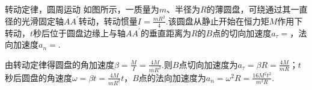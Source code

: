{\hspace{-2.16em}
\begin{minipage}{0.67\textwidth}
\begin{exercise}{4}{转动定律，圆周运动}
    如图所示，一质量为$m$、半径为$R$的薄圆盘，可绕通过其一直径的光滑固定轴$AA^{\prime}$转动，转动惯量$I=\frac{mR^2}{4}$.该圆盘从静止开始在恒力矩$M$作用下转动，$t$秒后位于圆盘边缘上与轴$AA^{\prime}$的垂直距离为$R$的$B$点的切向加速度$a_{\tau}=$，法向加速度$a_n=$.
\end{exercise}
\end{minipage}
\hfill
\begin{minipage}[c]{0.33\textwidth}
\begin{center}
\end{center}
\end{minipage}
\begin{solution}
    由转动定律得圆盘的角加速度$\beta=\frac{M}{I}=\frac{4M}{mR^2}$.则$B$点切向加速度为$a_{\tau}=\beta R=\frac{4M}{mR}$；$t$秒后圆盘的角速度$\omega=\beta t=\frac{4M}{mR^2}t$，$B$点的法向加速度为$a_n=\omega^2R=\frac{16M^2t^2}{m^2R}$.
\end{solution}

}
